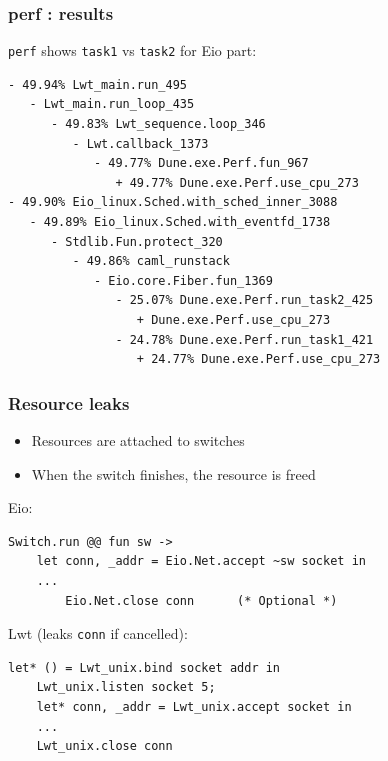 \documentclass{beamer}
\begin{document}
\begin{frame}[fragile]
	\frametitle{perf : results}
        \verb|perf| shows \verb|task1| vs \verb|task2| for Eio part:
	\scriptsize
\begin{verbatim}
- 49.94% Lwt_main.run_495
   - Lwt_main.run_loop_435
      - 49.83% Lwt_sequence.loop_346
         - Lwt.callback_1373
            - 49.77% Dune.exe.Perf.fun_967
               + 49.77% Dune.exe.Perf.use_cpu_273
- 49.90% Eio_linux.Sched.with_sched_inner_3088
   - 49.89% Eio_linux.Sched.with_eventfd_1738
      - Stdlib.Fun.protect_320
         - 49.86% caml_runstack
            - Eio.core.Fiber.fun_1369
               - 25.07% Dune.exe.Perf.run_task2_425
                  + Dune.exe.Perf.use_cpu_273
               - 24.78% Dune.exe.Perf.run_task1_421
                  + 24.77% Dune.exe.Perf.use_cpu_273
\end{verbatim}
\end{frame}

% 

\begin{frame}[fragile]
	\frametitle{Resource leaks}
	\begin{itemize}
		\item Resources are attached to switches
		\item When the switch finishes, the resource is freed
	\end{itemize}
	Eio:
	\begin{lstlisting}[style=ocaml]
	Switch.run @@ fun sw ->
	let conn, _addr = Eio.Net.accept ~sw socket in
	...
        Eio.Net.close conn      (* Optional *)
	\end{lstlisting}
        Lwt (leaks \verb|conn| if cancelled):
	\begin{lstlisting}[style=ocaml]
	let* () = Lwt_unix.bind socket addr in
	Lwt_unix.listen socket 5;
	let* conn, _addr = Lwt_unix.accept socket in
	...
	Lwt_unix.close conn
	\end{lstlisting}
\end{frame}
\end{document}

